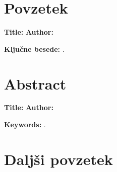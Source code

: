 \label{ch:abstract}

\chapter*{Povzetek}
\noindent\textbf{Title:} \tTitle
\bigskip
\noindent\textbf{Author:} \tAuthor
\bigskip
\noindent

\lipsum[1-6] %

\bigskip
\noindent\textbf{Ključne besede:} \tKeywords.

\chapter*{Abstract}
\noindent\textbf{Title:} \tTitleEn
\bigskip
\noindent\textbf{Author:} \tAuthor
\bigskip
\noindent

\lipsum[1-6] %

\bigskip
\noindent\textbf{Keywords:} \tKeywordsEn.

\clearemptydoublepage

\chapter*{Daljši povzetek}
\label{ch:long-abstract}

\lipsum[1-17] %

\clearemptydoublepage
